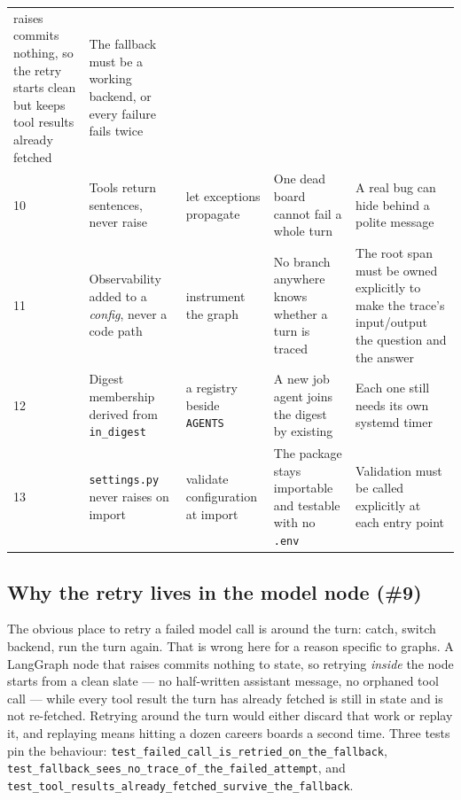 \documentclass[11pt,a4paper]{article}
\begin{document}
\begin{table}[!ht]
\begin{tabularx}{\textwidth}{L{0.4cm} L{3.5cm} L{3.0cm} X L{3.1cm}}
  raises commits nothing, so the retry starts clean but keeps tool results already fetched &
  The fallback must be a working backend, or every failure fails twice \\
10 & Tools return sentences, never raise & let exceptions propagate & One dead board cannot
  fail a whole turn & A real bug can hide behind a polite message \\
11 & Observability added to a \emph{config}, never a code path & instrument the graph &
  No branch anywhere knows whether a turn is traced & The root span must be owned explicitly
  to make the trace's input/output the question and the answer \\
12 & Digest membership derived from \texttt{in\_\allowbreak{}digest} & a registry beside \texttt{AGENTS} &
  A new job agent joins the digest by existing & Each one still needs its own systemd timer \\
13 & \texttt{settings.py} never raises on import & validate configuration at import &
  The package stays importable and testable with no \texttt{.env} & Validation must be
  called explicitly at each entry point \\
\bottomrule
\end{tabularx}
\end{table}

\subsection{Why the retry lives in the model node (\#9)}

The obvious place to retry a failed model call is around the turn: catch, switch backend,
run the turn again. That is wrong here for a reason specific to graphs. A LangGraph node
that raises commits nothing to state, so retrying \emph{inside} the node starts from a clean
slate --- no half-written assistant message, no orphaned tool call --- while every tool
result the turn has already fetched is still in state and is not re-fetched. Retrying around
the turn would either discard that work or replay it, and replaying means hitting a dozen
careers boards a second time. Three tests pin the behaviour:
\texttt{test\_\allowbreak{}failed\_\allowbreak{}call\_\allowbreak{}is\_\allowbreak{}retried\_\allowbreak{}on\_\allowbreak{}the\_\allowbreak{}fallback},
\texttt{test\_\allowbreak{}fallback\_\allowbreak{}sees\_\allowbreak{}no\_\allowbreak{}trace\_\allowbreak{}of\_\allowbreak{}the\_\allowbreak{}failed\_\allowbreak{}attempt}, and
\texttt{test\_\allowbreak{}tool\_\allowbreak{}results\_\allowbreak{}already\_\allowbreak{}fetched\_\allowbreak{}survive\_\allowbreak{}the\_\allowbreak{}fallback}.
\end{document}
